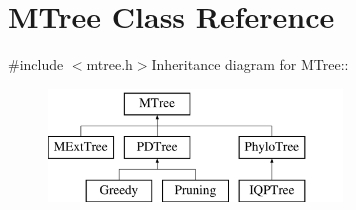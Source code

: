 \hypertarget{classMTree}{
\section{MTree Class Reference}
\label{classMTree}
}


{\ttfamily \#include $<$mtree.h$>$}Inheritance diagram for MTree::\begin{figure}[H]
\begin{center}
\leavevmode
\includegraphics[height=3cm]{classMTree}
\end{center}
\end{figure}
